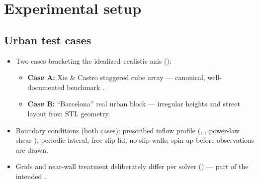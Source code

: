 \section{Experimental setup}
\label{sec:setup}


\subsection{Urban test cases}
\label{sec:setup:cases}
\begin{itemize}
  \item Two cases bracketing the idealized--realistic axis
        ():
        \begin{itemize}
          \item \textbf{Case A:} Xie \& Castro staggered cube array ---
                canonical, well-documented benchmark \cite{xie2006les,xie2009modelling}.
          \item \textbf{Case B:} ``Barcelona'' real urban block --- irregular
                heights and street layout from STL geometry.
        \end{itemize}
  \item Boundary conditions (both cases): prescribed inflow profile
        (\velmag, \inflowangle, power-law shear \shearexp), periodic lateral,
        free-slip lid, no-slip walls; spin-up before observations are drawn.
  \item Grids and near-wall treatment deliberately differ per solver
        () --- part of the intended \discrepancy.
\end{itemize}

\begin{table}[t]
  \centering
  \caption{Test cases: domain, grid, and boundary conditions per solver.}
  \label{tab:cases}
\end{table}

\begin{table}[t]
  \centering
  \caption{Structural solver differences (discretization, closure, geometry
    representation, wall treatment) --- the source of \discrepancy.}
  \label{tab:solver-differences}
\end{table}

